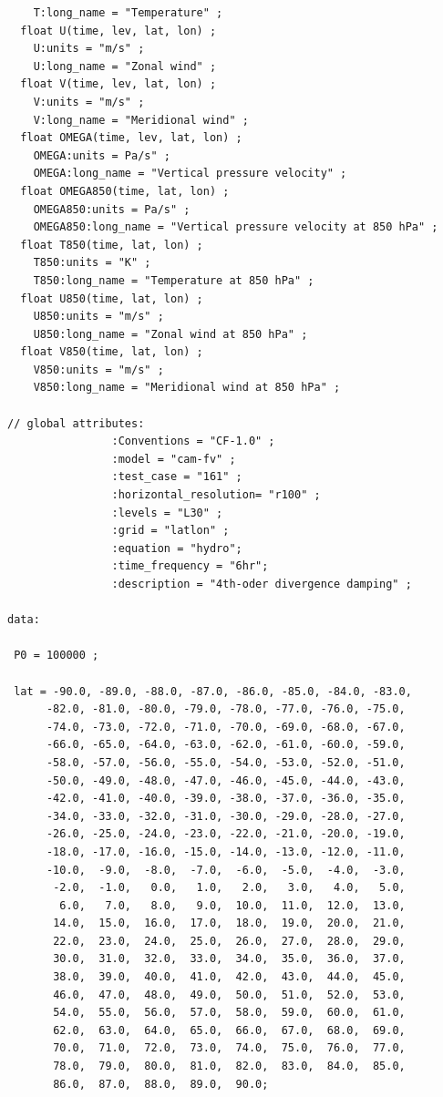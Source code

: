 \documentclass[times,doublespace]{fldauth}
\begin{document}
{\begin{appendix}
\begin{verbatim}
    T:long_name = "Temperature" ;
  float U(time, lev, lat, lon) ;
    U:units = "m/s" ;
    U:long_name = "Zonal wind" ;
  float V(time, lev, lat, lon) ;
    V:units = "m/s" ;
    V:long_name = "Meridional wind" ;
  float OMEGA(time, lev, lat, lon) ;
    OMEGA:units = Pa/s" ;
    OMEGA:long_name = "Vertical pressure velocity" ;
  float OMEGA850(time, lat, lon) ;
    OMEGA850:units = Pa/s" ;
    OMEGA850:long_name = "Vertical pressure velocity at 850 hPa" ;
  float T850(time, lat, lon) ;
    T850:units = "K" ;
    T850:long_name = "Temperature at 850 hPa" ;
  float U850(time, lat, lon) ;
    U850:units = "m/s" ;
    U850:long_name = "Zonal wind at 850 hPa" ;
  float V850(time, lat, lon) ;
    V850:units = "m/s" ;
    V850:long_name = "Meridional wind at 850 hPa" ;
    
// global attributes:
                :Conventions = "CF-1.0" ;
                :model = "cam-fv" ;
                :test_case = "161" ;
                :horizontal_resolution= "r100" ;
                :levels = "L30" ;
                :grid = "latlon" ;
                :equation = "hydro";
                :time_frequency = "6hr";
                :description = "4th-oder divergence damping" ;

data:

 P0 = 100000 ;

 lat = -90.0, -89.0, -88.0, -87.0, -86.0, -85.0, -84.0, -83.0, 
      -82.0, -81.0, -80.0, -79.0, -78.0, -77.0, -76.0, -75.0, 
      -74.0, -73.0, -72.0, -71.0, -70.0, -69.0, -68.0, -67.0, 
      -66.0, -65.0, -64.0, -63.0, -62.0, -61.0, -60.0, -59.0, 
      -58.0, -57.0, -56.0, -55.0, -54.0, -53.0, -52.0, -51.0, 
      -50.0, -49.0, -48.0, -47.0, -46.0, -45.0, -44.0, -43.0, 
      -42.0, -41.0, -40.0, -39.0, -38.0, -37.0, -36.0, -35.0, 
      -34.0, -33.0, -32.0, -31.0, -30.0, -29.0, -28.0, -27.0, 
      -26.0, -25.0, -24.0, -23.0, -22.0, -21.0, -20.0, -19.0, 
      -18.0, -17.0, -16.0, -15.0, -14.0, -13.0, -12.0, -11.0, 
      -10.0,  -9.0,  -8.0,  -7.0,  -6.0,  -5.0,  -4.0,  -3.0, 
       -2.0,  -1.0,   0.0,   1.0,   2.0,   3.0,   4.0,   5.0, 
        6.0,   7.0,   8.0,   9.0,  10.0,  11.0,  12.0,  13.0, 
       14.0,  15.0,  16.0,  17.0,  18.0,  19.0,  20.0,  21.0, 
       22.0,  23.0,  24.0,  25.0,  26.0,  27.0,  28.0,  29.0, 
       30.0,  31.0,  32.0,  33.0,  34.0,  35.0,  36.0,  37.0, 
       38.0,  39.0,  40.0,  41.0,  42.0,  43.0,  44.0,  45.0, 
       46.0,  47.0,  48.0,  49.0,  50.0,  51.0,  52.0,  53.0, 
       54.0,  55.0,  56.0,  57.0,  58.0,  59.0,  60.0,  61.0, 
       62.0,  63.0,  64.0,  65.0,  66.0,  67.0,  68.0,  69.0, 
       70.0,  71.0,  72.0,  73.0,  74.0,  75.0,  76.0,  77.0, 
       78.0,  79.0,  80.0,  81.0,  82.0,  83.0,  84.0,  85.0, 
       86.0,  87.0,  88.0,  89.0,  90.0;


\end{verbatim}
\end{appendix}}
\end{document}
